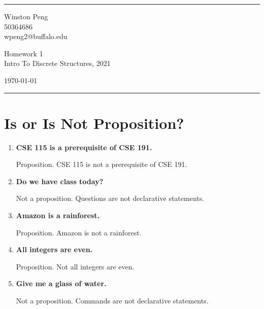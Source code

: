\documentclass[a4paper]{article}
\begin{document}

\fancyhead[C]{}
\hrule \medskip %
\begin{minipage}{0.295\textwidth} 
\raggedright
\footnotesize
Winston Peng \hfill\\   
50364686 \hfill\\
wpeng2@buffalo.edu
\end{minipage}
\begin{minipage}{0.4\textwidth} 
\centering 
\large 
Homework 1\\ 
\normalsize 
Intro To Discrete Structures, 2021\\ 
\end{minipage}
\begin{minipage}{0.295\textwidth} 
\raggedleft
\today\hfill\\
\end{minipage}
\medskip\hrule 
\bigskip


\section{Is or Is Not Proposition?}
\begin{enumerate}
    \item\textbf{CSE 115 is a prerequisite of CSE 191.}
    
    Proposition. CSE 115 is not a prerequisite of CSE 191.
    
    \item\textbf{Do we have class today?}
    
    Not a proposition. Questions are not declarative statements.
    
    \item\textbf{Amazon is a rainforest.}
    
    Proposition. Amazon is not a rainforest.
    
    \item\textbf{All integers are even.}
    
    Proposition. Not all integers are even.
    
    \item\textbf{Give me a glass of water.}
    
    Not a proposition. Commands are not declarative statements.
\end{enumerate}
\end{document}
